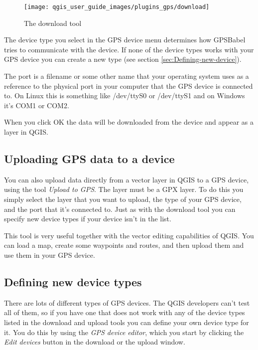 %
\begin{figure}

\caption{\label{figure download}The download tool}

\texttt{[image: qgis\_user\_guide\_images/plugins\_gps/download]}
\end{figure}


The device type you select in the GPS device menu determines how GPSBabel
tries to communicate with the device. If none of the device types
works with your GPS device you can create a new type (see section
\ref{sec:Defining-new-device}).

The port is a filename or some other name that your operating system
uses as a reference to the physical port in your computer that the
GPS device is connected to. On Linux this is something like /dev/ttyS0
or /dev/ttyS1 and on Windows it's COM1 or COM2.

When you click OK the data will be downloaded from the device and
appear as a layer in QGIS.


\subsection{Uploading GPS data to a device}

You can also upload data directly from a vector layer in QGIS to a
GPS device, using the tool \emph{Upload to GPS}. The layer must be
a GPX layer. To do this you simply select the layer that you want
to upload, the type of your GPS device, and the port that it's connected
to. Just as with the download tool you can specify new device types
if your device isn't in the list.

This tool is very useful together with the vector editing capabilities
of QGIS. You can load a map, create some waypoints and routes, and
then upload them and use them in your GPS device.


\subsection{\label{sec:Defining-new-device}Defining new device types}

There are lots of different types of GPS devices. The QGIS developers
can't test all of them, so if you have one that does not work with
any of the device types listed in the download and upload tools you
can define your own device type for it. You do this by using the \emph{GPS
device editor}, which you start by clicking the \emph{Edit devices}
button in the download or the upload window.

